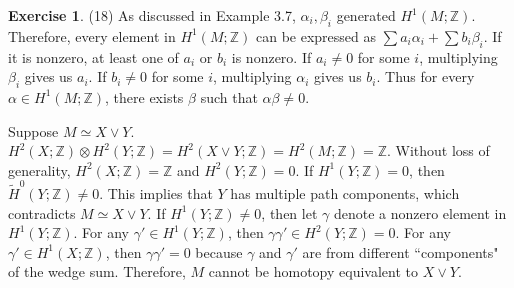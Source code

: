 \documentclass[12pt, psamsfonts]{amsart}
\theoremstyle{definition}
\newtheorem*{exer}{Exercise}
\theoremstyle{remark}
\numberwithin{equation}{section}
\begin{document}
\begin{exer}{(18)}
  As discussed in Example 3.7, $\alpha_i, \beta_i$ generated $H^1(M; \mathbb{Z})$.
  Therefore, every element in $H^1(M; \mathbb{Z})$ can be expressed as $\sum a_i\alpha_i + \sum b_i\beta_i$.
  If it is nonzero, at least one of $a_i$ or $b_i$ is nonzero.
  If $a_i \ne 0$ for some $i$, multiplying $\beta_i$ gives us $a_i$.
  If $b_i \ne 0$ for some $i$, multiplying $\alpha_i$ gives us $b_i$.
  Thus for every $\alpha \in H^1(M; \mathbb{Z})$, there exists $\beta$ such that $\alpha\beta \ne 0$.

  Suppose $M \simeq X \vee Y$.
  $H^2(X; \mathbb{Z}) \otimes H^2(Y;\mathbb{Z}) = H^2(X \vee Y; \mathbb{Z}) = H^2(M; \mathbb{Z}) = \mathbb{Z}$.
  Without loss of generality, $H^2(X; \mathbb{Z}) = \mathbb{Z}$ and $H^2(Y; \mathbb{Z}) = 0$.
  If $H^1(Y; \mathbb{Z}) = 0$, then $\tilde{H}^0(Y; \mathbb{Z}) \ne 0$.
  This implies that $Y$ has multiple path components, which contradicts $M \simeq X \vee Y$.
  If $H^1(Y; \mathbb{Z}) \ne 0$, then let $\gamma$ denote a nonzero element in $H^1(Y; \mathbb{Z})$.
  For any $\gamma' \in H^1(Y; \mathbb{Z})$, then $\gamma\gamma' \in H^2(Y; \mathbb{Z}) = 0$.
  For any $\gamma' \in H^1(X; \mathbb{Z})$, then $\gamma\gamma' = 0$ because $\gamma$ and $\gamma'$ are from different ``components" of the wedge sum.
  Therefore, $M$ cannot be homotopy equivalent to $X \vee Y$.
\end{exer}
\end{document}

